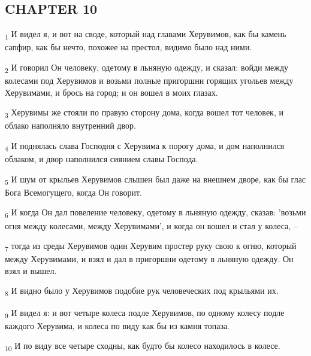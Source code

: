 \subsection{CHAPTER 10}
\begin{tcolorbox}
\textsubscript{1} И видел я, и вот на своде, который над главами Херувимов, как бы камень сапфир, как бы нечто, похожее на престол, видимо было над ними.
\end{tcolorbox}
\begin{tcolorbox}
\textsubscript{2} И говорил Он человеку, одетому в льняную одежду, и сказал: войди между колесами под Херувимов и возьми полные пригоршни горящих угольев между Херувимами, и брось на город; и он вошел в моих глазах.
\end{tcolorbox}
\begin{tcolorbox}
\textsubscript{3} Херувимы же стояли по правую сторону дома, когда вошел тот человек, и облако наполняло внутренний двор.
\end{tcolorbox}
\begin{tcolorbox}
\textsubscript{4} И поднялась слава Господня с Херувима к порогу дома, и дом наполнился облаком, и двор наполнился сиянием славы Господа.
\end{tcolorbox}
\begin{tcolorbox}
\textsubscript{5} И шум от крыльев Херувимов слышен был даже на внешнем дворе, как бы глас Бога Всемогущего, когда Он говорит.
\end{tcolorbox}
\begin{tcolorbox}
\textsubscript{6} И когда Он дал повеление человеку, одетому в льняную одежду, сказав: 'возьми огня между колесами, между Херувимами', и когда он вошел и стал у колеса, --
\end{tcolorbox}
\begin{tcolorbox}
\textsubscript{7} тогда из среды Херувимов один Херувим простер руку свою к огню, который между Херувимами, и взял и дал в пригоршни одетому в льняную одежду. Он взял и вышел.
\end{tcolorbox}
\begin{tcolorbox}
\textsubscript{8} И видно было у Херувимов подобие рук человеческих под крыльями их.
\end{tcolorbox}
\begin{tcolorbox}
\textsubscript{9} И видел я: и вот четыре колеса подле Херувимов, по одному колесу подле каждого Херувима, и колеса по виду как бы из камня топаза.
\end{tcolorbox}
\begin{tcolorbox}
\textsubscript{10} И по виду все четыре сходны, как будто бы колесо находилось в колесе.
\end{tcolorbox}
